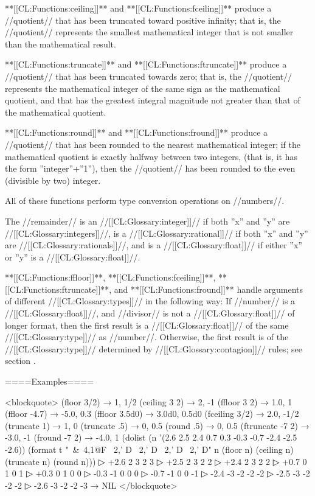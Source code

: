 **[[CL:Functions:ceiling]]** and **[[CL:Functions:fceiling]]** produce a //quotient// that has been truncated toward positive infinity; that is, the //quotient// represents the smallest mathematical integer that is not smaller than the mathematical result.


**[[CL:Functions:truncate]]** and **[[CL:Functions:ftruncate]]** produce a //quotient// that has been truncated towards zero; that is, the //quotient// represents the mathematical integer of the same sign as the mathematical quotient, and that has the greatest integral magnitude not greater than that of the mathematical quotient.


**[[CL:Functions:round]]** and **[[CL:Functions:fround]]** produce a //quotient// that has been rounded to the nearest mathematical integer; if the mathematical quotient is exactly halfway between two integers, (that is, it has the form ''integer''+''1''), then the //quotient// has been rounded to the even (divisible by two) integer.

\endlist

All of these functions perform type conversion operations on //numbers//.

The //remainder// is an //[[CL:Glossary:integer]]// if both ''x'' and ''y'' are //[[CL:Glossary:integers]]//, is a //[[CL:Glossary:rational]]// if both ''x'' and ''y'' are //[[CL:Glossary:rationals]]//, and is a //[[CL:Glossary:float]]// if either ''x'' or ''y'' is a //[[CL:Glossary:float]]//.

**[[CL:Functions:ffloor]]**, **[[CL:Functions:fceiling]]**, **[[CL:Functions:ftruncate]]**, and **[[CL:Functions:fround]]** handle arguments of different //[[CL:Glossary:types]]// in the following way: If //number// is a //[[CL:Glossary:float]]//, and //divisor// is not a //[[CL:Glossary:float]]// of longer format, then the first result is a //[[CL:Glossary:float]]// of the same //[[CL:Glossary:type]]// as //number//. Otherwise, the first result is of the //[[CL:Glossary:type]]// determined by //[[CL:Glossary:contagion]]// rules; see section {\secref\NumericContagionRules}.

====Examples====

<blockquote> (floor 3/2) → 1, 1/2 (ceiling 3 2) → 2, -1 (ffloor 3 2) → 1.0, 1 (ffloor -4.7) → -5.0, 0.3 (ffloor 3.5d0) → 3.0d0, 0.5d0 (fceiling 3/2) → 2.0, -1/2 (truncate 1) → 1, 0 (truncate .5) → 0, 0.5 (round .5) → 0, 0.5 (ftruncate -7 2) → -3.0, -1 (fround -7 2) → -4.0, 1 (dolist (n '(2.6 2.5 2.4 0.7 0.3 -0.3 -0.7 -2.4 -2.5 -2.6)) (format t "~&~4,1@F ~2,' D ~2,' D ~2,' D ~2,' D" n (floor n) (ceiling n) (truncate n) (round n)))
▷ +2.6 2 3 2 3
▷ +2.5 2 3 2 2
▷ +2.4 2 3 2 2
▷ +0.7 0 1 0 1
▷ +0.3 0 1 0 0
▷ -0.3 -1 0 0 0
▷ -0.7 -1 0 0 -1
▷ -2.4 -3 -2 -2 -2
▷ -2.5 -3 -2 -2 -2
▷ -2.6 -3 -2 -2 -3 → NIL </blockquote>

